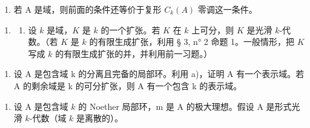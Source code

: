 \begin{enumerate}
\def\labelenumi{\alph{enumi})}
\setcounter{enumi}{1}
\tightlist
\item
  若 A 是域，则前面的条件还等价于复形 \(C_{k}(A)\) 零调这一条件。
\end{enumerate}

\begin{enumerate}
\def\labelenumi{\arabic{enumi})}
\setcounter{enumi}{3}
\tightlist
\item
  \begin{enumerate}
  \def\labelenumii{\alph{enumii})}
  \tightlist
  \item
    设 \(k\) 是域，\(K\) 是 \(k\) 的一个扩张。若 \(K\) 在 \(k\) 上可分，则 \(K\) 是光滑 \(k\)-代数。（若 \(K\) 是 \(k\) 的有限生成扩张，利用 § 3, n° 2 命题 1。一般情形，把 \(K\) 写成 \(k\) 的有限生成扩张的并，并利用前一习题。）
  \end{enumerate}
\end{enumerate}

\begin{enumerate}
\def\labelenumi{\alph{enumi})}
\setcounter{enumi}{1}
\tightlist
\item
  设 A 是包含域 k 的分离且完备的局部环。利用 a)，证明 A 有一个表示域。若 A 的剩余域是 k 的可分扩张，则 A 有一个包含 k 的表示域。
\end{enumerate}

\begin{enumerate}
\def\labelenumi{\arabic{enumi})}
\setcounter{enumi}{4}
\tightlist
\item
  设 A 是包含域 \(k\) 的 Noether 局部环，m 是 A 的极大理想。假设 A 是形式光滑 \(k\)-代数（域 \(k\) 是离散的）。
\end{enumerate}

